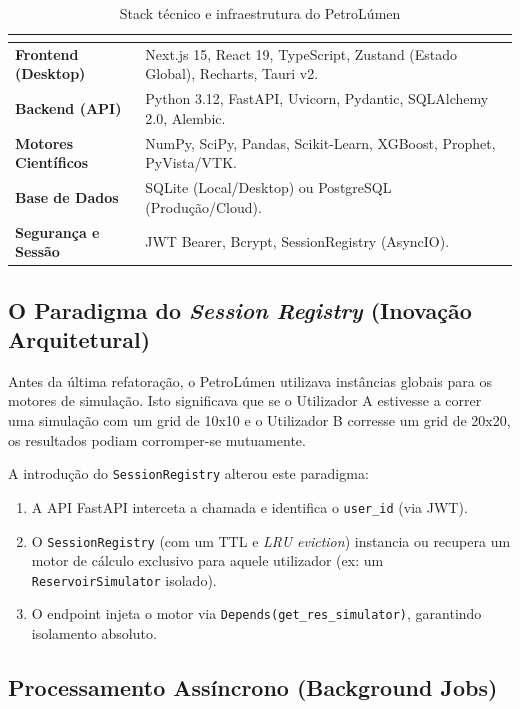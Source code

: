 \documentclass[12pt,a4paper]{article}
\renewcommand{\arraystretch}{1.15}
\begin{document}
\begin{table}[H]
\centering
\renewcommand{\arraystretch}{1.3}
\begin{tabularx}{\textwidth}{>{\bfseries}p{3.5cm} X}
\toprule
\rowcolor{tableheader}
\multicolumn{2}{c}{\textcolor{white}{\textbf{Stack Tecnológico do PetroLúmen}}} \\
\midrule
Frontend (Desktop) & Next.js 15, React 19, TypeScript, Zustand (Estado Global), Recharts, Tauri v2.\\
Backend (API) & Python 3.12, FastAPI, Uvicorn, Pydantic, SQLAlchemy 2.0, Alembic.\\
Motores Científicos & NumPy, SciPy, Pandas, Scikit-Learn, XGBoost, Prophet, PyVista/VTK.\\
Base de Dados & SQLite (Local/Desktop) ou PostgreSQL (Produção/Cloud).\\
Segurança e Sessão & JWT Bearer, Bcrypt, SessionRegistry (AsyncIO).\\
\bottomrule
\end{tabularx}
\caption{Stack técnico e infraestrutura do PetroLúmen}
\end{table}

\subsection{O Paradigma do \textit{Session Registry} (Inovação Arquitetural)}

Antes da última refatoração, o PetroLúmen utilizava instâncias globais para os motores de simulação. Isto significava que se o Utilizador A estivesse a correr uma simulação com um grid de 10x10 e o Utilizador B corresse um grid de 20x20, os resultados podiam corromper-se mutuamente.

A introdução do \texttt{SessionRegistry} alterou este paradigma:
\begin{enumerate}
    \item A API FastAPI interceta a chamada e identifica o \texttt{user\_id} (via JWT).
    \item O \texttt{SessionRegistry} (com um TTL e \textit{LRU eviction}) instancia ou recupera um motor de cálculo exclusivo para aquele utilizador (ex: um \texttt{ReservoirSimulator} isolado).
    \item O endpoint injeta o motor via \texttt{Depends(get\_res\_simulator)}, garantindo isolamento absoluto.
\end{enumerate}

\subsection{Processamento Assíncrono (Background Jobs)}
\end{document}
